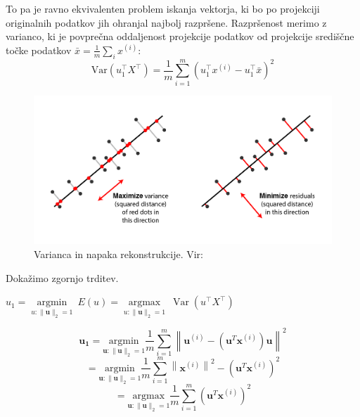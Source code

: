 To pa je ravno ekvivalenten problem iskanja vektorja, ki bo po projekciji originalnih podatkov jih ohranjal najbolj razpršene. Razpršenost merimo z varianco, ki je povprečna oddaljenost projekcije podatkov od projekcije središčne točke podatkov $\bar{x} = \frac{1}{m} \sum_{i} x^{(i)}$:
\begin{equation}
    \mathrm{Var}(u_1^{\top}X^{\top}) = \frac{1}{m} \sum_{i=1}^{m} \left(u_1^{\top}x^{(i)} - u_1^{\top}\bar{x}\right)^2
\end{equation}
\begin{figure}[H]
    \centering
    \includegraphics[width=1\linewidth]{slike/pcaDvaPogleda.png}
    \caption{Varianca in napaka rekonstrukcije. Vir: \cite{quora_pca_explanation}}
    \label{fig:backprop}
\end{figure}

Dokažimo zgornjo trditev.
\begin{trditev}
    $u_{1} = \underset{u:\|\mathbf{u}\|_2=1}{\operatorname{argmin}}\ E(u) = \underset{u:\|\mathbf{u}\|_2=1}{\operatorname{argmax}}\ \operatorname{Var}(u^{\top}X^{\top})$
\end{trditev}
\begin{dokaz}
    \begin{equation}
\mathbf{u_{1}} = \underset{\mathbf{u}:\|\mathbf{u}\|_2=1}{\mathrm{argmin}} \frac{1}{m} \sum_{i=1}^{m} \left\| \mathbf{u}^{(i)} - (\mathbf{u}^T \mathbf{x}^{(i)})\mathbf{u} \right\|^2
\end{equation}
\begin{equation}
= \underset{\mathbf{u}:\|\mathbf{u}\|_2=1}{\mathrm{argmin}} \frac{1}{m} \sum_{i=1}^{m} \left\| \mathbf{x}^{(i)} \right\|^2 - (\mathbf{u}^T \mathbf{x}^{(i)})^2
\end{equation}
\begin{equation}
= \underset{\mathbf{u}:\|\mathbf{u}\|_2=1}{\mathrm{argmax}} \frac{1}{m} \sum_{i=1}^{m} (\mathbf{u}^T \mathbf{x}^{(i)})^2
\end{equation}
\end{dokaz} \cite{gormley2018pca} \\
